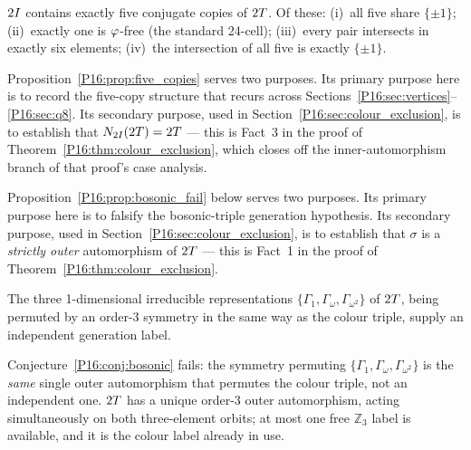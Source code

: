 \begin{proposition}
\label{P16:prop:five_copies}
$2I$ contains exactly five conjugate copies of $2T$.
Of these: (i)~all five share $\{\pm1\}$; (ii)~exactly one is
$\varphi$-free (the standard 24-cell); (iii)~every pair intersects in
exactly six elements; (iv)~the intersection of all five is exactly
$\{\pm1\}$.
\end{proposition}

\begin{remark}
\label{P16:rem:double_role_proposition}
Proposition~\ref{P16:prop:five_copies} serves two purposes.  Its primary
purpose here is to record the five-copy structure that recurs across
Sections~\ref{P16:sec:vertices}--\ref{P16:sec:q8}.  Its secondary purpose,
used in Section~\ref{P16:sec:colour_exclusion}, is to establish that
$N_{2I}(2T)=2T$ --- this is Fact~3 in the proof of
Theorem~\ref{P16:thm:colour_exclusion}, which closes off the inner-automorphism
branch of that proof's case analysis.
\end{remark}

\begin{remark}
\label{P16:rem:double_role_section}
Proposition~\ref{P16:prop:bosonic_fail} below serves two purposes.
Its primary purpose here is to falsify the bosonic-triple generation
hypothesis.  Its secondary purpose, used in
Section~\ref{P16:sec:colour_exclusion}, is to establish that $\sigma$ is a
\emph{strictly outer} automorphism of $2T$ --- this is Fact~1 in
the proof of Theorem~\ref{P16:thm:colour_exclusion}.
\end{remark}

\begin{conjecture}
\label{P16:conj:bosonic}
The three 1-dimensional irreducible representations
$\{\Gamma_1,\Gamma_\omega,\Gamma_{\omega^2}\}$ of $2T$, being
permuted by an order-3 symmetry in the same way as the colour triple,
supply an independent generation label.
\end{conjecture}

\begin{proposition}
\label{P16:prop:bosonic_fail}
Conjecture~\ref{P16:conj:bosonic} fails: the symmetry permuting
$\{\Gamma_1,\Gamma_\omega,\Gamma_{\omega^2}\}$ is the \emph{same}
single outer automorphism that permutes the colour triple, not an
independent one. $2T$ has a unique order-3 outer automorphism,
acting simultaneously on both three-element orbits; at most one free
$\mathbb{Z}_3$ label is available, and it is the colour label already
in use.
\end{proposition}

